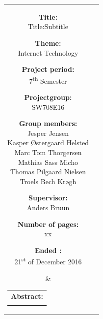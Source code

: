 \begin{titlepage}
\begin{nopagebreak}
{			\noindent
			\begin{tabular}{cc}
				\parbox[t]{.45\textwidth}{
					\vspace{.15cm}
					\begin{description}
						\item {\bf Title:}\\
						Title:Subtitle
						\item {\bf Theme:}\\
						Internet Technology
						\item {\bf Project period:}\\
							7\textsuperscript{th} Semester
			 				\hspace{4cm}
						\item {\bf Projectgroup:}\\
							SW708E16
			  				\hspace{4cm}
						\item {\bf Group members:}\\
						Jesper Jensen \\
						Kasper Østergaard Helsted \\
						Marc Tom Thorgersen \\
						Mathias Sass Micho \\
						Thomas Pilgaard Nielsen \\
						Troels Bech Krøgh
						\item {\bf Supervisor:}\\
							Anders Bruun
						\item {\bf Number of pages:}\\
							xx
						\item {\bf Ended :}\\
							21\textsuperscript{st} of December 2016
					\end{description}
				} &
				\parbox[t]{.45\textwidth}{
					\vspace{.15cm}
					\hfill
					\begin{tabular}[t]{l}
						{\bf Abstract:}\bigskip \\
						\fbox{
							\parbox{.35\textwidth}{\smallskip
								{\vfill{\small
										
								\smallskip}}
							}
						}
					\end{tabular}
				}
			\end{tabular}
		}
	\end{nopagebreak}
\end{titlepage}
